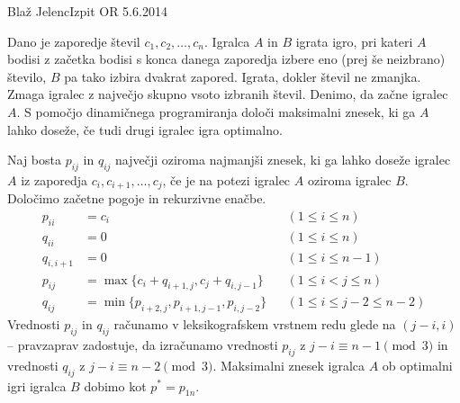 \begin{naloga}{Blaž Jelenc}{Izpit OR 5.6.2014}
\begin{vprasanje}
Dano je zaporedje števil $c_1, c_2, \dots, c_n$.
Igralca $A$ in $B$ igrata igro,
pri kateri $A$ bodisi z začetka bodisi s konca danega zaporedja
izbere eno (prej še neizbrano) število,
$B$ pa tako izbira dvakrat zapored.
Igrata, dokler števil ne zmanjka.
Zmaga igralec z največjo skupno vsoto izbranih števil.
Denimo, da začne igralec $A$.
S pomočjo dinamičnega programiranja določi maksimalni znesek,
ki ga $A$ lahko doseže, če tudi drugi igralec igra optimalno.
\end{vprasanje}

\begin{odgovor}
Naj bosta $p_{ij}$ in $q_{ij}$ največji oziroma najmanjši znesek,
ki ga lahko doseže igralec $A$ iz zaporedja $c_i, c_{i+1}, \dots, c_j$,
če je na potezi igralec $A$ oziroma igralec $B$.
Določimo začetne pogoje in rekurzivne enačbe.
\begin{align*}
p_{ii} &= c_i && (1 \le i \le n) \\
q_{ii} &= 0 && (1 \le i \le n) \\
q_{i,i+1} &= 0 && (1 \le i \le n-1) \\
p_{ij} &= \max\{c_i + q_{i+1,j}, c_j + q_{i,j-1}\} && (1 \le i < j \le n) \\
q_{ij} &= \min\{p_{i+2,j}, p_{i+1,j-1}, p_{i,j-2}\} && (1 \le i \le j-2 \le n-2)
\end{align*}
Vrednosti $p_{ij}$ in $q_{ij}$ računamo
v leksikografskem vrstnem redu glede na $(j-i, i)$
-- pravzaprav zadostuje,
da izračunamo vrednosti $p_{ij}$ z $j-i \equiv n-1 \pmod{3}$
in vrednosti $q_{ij}$ z $j-i \equiv n-2 \pmod{3}$.
Maksimalni znesek igralca $A$ ob optimalni igri igralca $B$
dobimo kot $p^* = p_{1n}$.
\end{odgovor}
\end{naloga}
